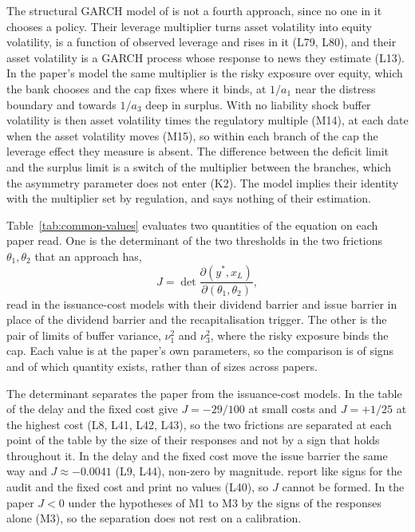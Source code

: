 The structural GARCH model of \citet{engle2018} is not a fourth approach, since
no one in it chooses a policy. Their leverage multiplier turns asset volatility
into equity volatility, is a function of observed leverage and rises in it
(L79, L80), and their asset volatility is a GARCH process whose response to
news they estimate (L13). In the paper's model the same multiplier is the risky
exposure over equity, which the bank chooses and the cap fixes where it binds,
at $1/a_1$ near the distress boundary and towards $1/a_3$ deep in surplus. With
no liability shock buffer volatility is then asset volatility times the
regulatory multiple (M14), at each date when the asset volatility moves (M15),
so within each branch of the cap the leverage effect they measure is absent.
The difference between the deficit limit and the surplus limit is a switch of
the multiplier between the branches, which the asymmetry parameter does not
enter (K2). The model implies their identity with the multiplier set by
regulation, and says nothing of their estimation.

Table~\ref{tab:common-values} evaluates two quantities of the equation on
each paper read. One is the determinant of the two thresholds in the two
frictions $\theta_1,\theta_2$ that an approach has,
\[
J=\det\frac{\partial(y^*,x_L)}{\partial(\theta_1,\theta_2)} ,
\]
read in the issuance-cost models with their dividend barrier and issue barrier
in place of the dividend barrier and the recapitalisation trigger. The other is
the pair of limits of buffer variance, $\nu_1^2$ and $\nu_3^2$, where the risky
exposure binds the cap. Each value is at the paper's own parameters, so the
comparison is of signs and of which quantity exists, rather than of sizes
across papers.

The determinant separates the paper from the issuance-cost models. In the
table of \citet{peura2006} the delay and the fixed cost give $J=-29/100$ at
small costs and $J=+1/25$ at the highest cost (L8, L41, L42, L43), so the two
frictions are separated at each point of the table by the size of their
responses and not by a sign that holds throughout it. In
\citet{daihuangkeppo2019} the delay and the fixed cost move the issue barrier the
same way and
$J\approx-0.0041$ (L9, L44), non-zero by magnitude. \citet{milnewhalley2001}
report like signs for the audit and the fixed cost and print no values (L40),
so $J$ cannot be formed. In the paper $J<0$ under the hypotheses of M1 to M3
by the signs of the responses alone (M3), so the separation does not rest on a
calibration.

